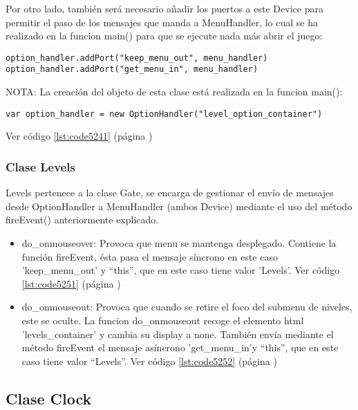 Por otro lado, también será necesario añadir los puertos a  este Device para permitir el paso de los mensajes que manda a MenuHandler, 
lo cual se ha realizado en la  funcion main() para que se ejecute nada más abrir el juego:

\begin{verbatim}
option_handler.addPort("keep_menu_out", menu_handler)
option_handler.addPort("get_menu_in", menu_handler)
\end{verbatim}

NOTA: La creación del objeto de esta clase está realizada en la funcion main():

\begin{verbatim}
var option_handler = new OptionHandler("level_option_container")
\end{verbatim}

Ver código \ref{lst:code5241} (página \pageref{lst:code5241})


\subsubsection{Clase Levels}
\label{subsubsection:levels}

Levels pertenece a la clase Gate, se encarga de gestionar el envío de mensajes desde OptionHandler a MenuHandler
(ambos Device) mediante el uso del método fireEvent() anteriormente explicado.

\begin{itemize}
 \item do\_onmouseover: Provoca que menu se mantenga desplegado. Contiene la función fireEvent, ésta pasa el 
 mensaje síncrono en este caso 'keep\_menu\_out' y “this”, que en este caso tiene valor 'Levels'. 
 Ver código \ref{lst:code5251} (página \pageref{lst:code5251})

 \item do\_onmouseout: Provoca que cuando se retire el foco del submenu de niveles, este se oculte.
La funcion do\_onmouseout recoge el elemento html 'levels\_container' y cambia su display a none.
También envía mediante el método fireEvent el mensaje asíncrono 'get\_menu\_in'y “this”, que en este caso tiene valor “Levels”.
Ver código \ref{lst:code5252} (página \pageref{lst:code5252})
\end{itemize}


\subsection{Clase Clock}
\label{subsection:clock}

